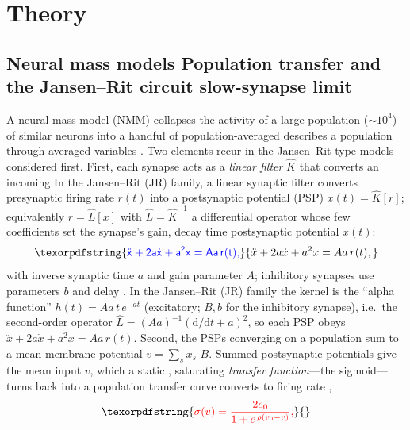 \documentclass[11pt,a4paper]{article}
\newcommand{\Sig}{\sigma}
\providecommand{\DIFaddtex}[1]{{\protect\color{blue} \sf #1}} %
\providecommand{\DIFdeltex}[1]{{\protect\color{red} \scriptsize #1}} %
\providecommand{\DIFaddbegin}{} %
\providecommand{\DIFaddend}{} %
\providecommand{\DIFdelbegin}{} %
\providecommand{\DIFdelend}{} %
\providecommand{\DIFadd}[1]{\texorpdfstring{\DIFaddtex{#1}}{#1}} %
\providecommand{\DIFdel}[1]{\texorpdfstring{\DIFdeltex{#1}}{}} %
\begin{document}
\section{Theory}

\subsection{\DIFdelbegin \DIFdel{Neural mass models }\DIFdelend \DIFaddbegin \DIFadd{Population transfer }\DIFaddend and the \DIFdelbegin \DIFdel{Jansen--Rit circuit}\DIFdelend \DIFaddbegin \DIFadd{slow-synapse limit}\DIFaddend }\label{sec:nmm}
A neural mass model \DIFdelbegin \DIFdel{(NMM) collapses the activity of a large population ($\sim 10^4$) of similar neurons into a handful of population-averaged }\DIFdelend \DIFaddbegin \DIFadd{describes a population through averaged }\DIFaddend variables
\cite{ruffini2025rosetta,jansen1995}. \DIFdelbegin \DIFdel{Two elements recur in the Jansen--Rit-type models
considered first.
First, each synapse acts as a \emph{linear filter} $\hat K$ that converts an
incoming }\DIFdelend \DIFaddbegin \DIFadd{In the Jansen--Rit (JR) family, a linear synaptic
filter converts }\DIFaddend presynaptic firing rate $r(t)$ into \DIFdelbegin \DIFdel{a postsynaptic potential (PSP)
$x(t)=\hat K[r]$; equivalently $r=\hat L[x]$ with $\hat L=\hat K^{-1}$ a
differential operator whose few coefficients set the synapse's gain, decay time }\DIFdelend \DIFaddbegin \DIFadd{postsynaptic potential $x(t)$:
}\[
\DIFadd{\ddot x+2a\dot x+a^2x=Aa\,r(t),
}\]
\DIFadd{with inverse synaptic time $a$ and gain parameter $A$; inhibitory synapses use
parameters $b$ }\DIFaddend and \DIFdelbegin \DIFdel{delay \cite{ruffini2025rosetta}. In the Jansen--Rit (JR) family the kernel is
the ``alpha function'' $h(t)=Aa\,t\,e^{-at}$ (excitatory; $B,b$ for the inhibitory synapse), i.e.\ the second-order operator
$\hat L=(Aa)^{-1}(\mathrm{d}/\mathrm{d}t+a)^2$, so each PSP obeys
$\ddot x+2a\dot x+a^2x = Aa\,r(t)$. Second, the PSPs converging on a population sum
to a mean membrane potential $v=\sum_s x_s$}\DIFdelend \DIFaddbegin \DIFadd{$B$. Summed postsynaptic potentials give the mean input $v$}\DIFaddend , which
a static \DIFdelbegin \DIFdel{, saturating
\emph{transfer function}---the sigmoid---turns back into a population }\DIFdelend \DIFaddbegin \DIFadd{transfer curve converts to }\DIFaddend firing rate \cite{wilsoncowan1972},
\DIFdelbegin \begin{displaymath}
\DIFdel{\Sig(v)=\frac{2e_0}{1+e^{\,\rho(v_0-v)}} ,
}\end{displaymath}%
\end{document}
